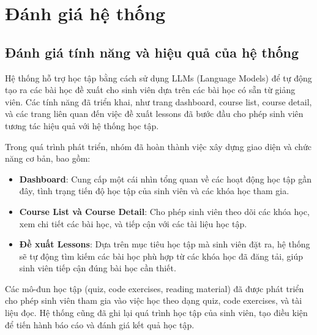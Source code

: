 \chapter{Đánh giá hệ thống}

\section{Đánh giá tính năng và hiệu quả của hệ thống}

Hệ thống hỗ trợ học tập bằng cách sử dụng LLMs (Language Models) để tự động tạo ra các bài học đề xuất cho sinh viên dựa trên các bài học có sẵn từ giảng viên. Các tính năng đã triển khai, như trang dashboard, course list, course detail, và các trang liên quan đến việc đề xuất lessons đã bước đầu cho phép sinh viên tương tác hiệu quả với hệ thống học tập.

Trong quá trình phát triển, nhóm đã hoàn thành việc xây dựng giao diện và chức năng cơ bản, bao gồm:

\begin{itemize}
    \item \textbf{Dashboard}: Cung cấp một cái nhìn tổng quan về các hoạt động học tập gần đây, tình trạng tiến độ học tập của sinh viên và các khóa học tham gia.
    \item \textbf{Course List và Course Detail}: Cho phép sinh viên theo dõi các khóa học, xem chi tiết các bài học, và tiếp cận với các tài liệu học tập.
    \item \textbf{Đề xuất Lessons}: Dựa trên mục tiêu học tập mà sinh viên đặt ra, hệ thống sẽ tự động tìm kiếm các bài học phù hợp từ các khóa học đã đăng tải, giúp sinh viên tiếp cận đúng bài học cần thiết.
\end{itemize}

Các mô-đun học tập (quiz, code exercises, reading material) đã được phát triển cho phép sinh viên tham gia vào việc học theo dạng quiz, code exercises, và tài liệu đọc. Hệ thống cũng đã ghi lại quá trình học tập của sinh viên, tạo điều kiện để tiến hành báo cáo và đánh giá kết quả học tập.
\newpage

\newpage
